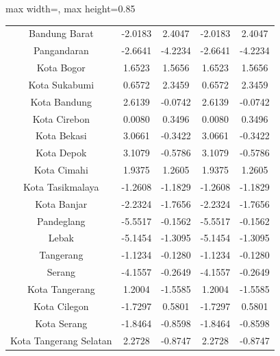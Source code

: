 \begin{table}[H]
\begin{adjustbox}{max width=\textwidth, max height=0.85\textheight}
\begin{tabular}{|c|c|c|c|c|}
Bandung Barat & -2.0183 & 2.4047 & -2.0183 & 2.4047 \\
Pangandaran & -2.6641 & -4.2234 & -2.6641 & -4.2234 \\
Kota Bogor & 1.6523 & 1.5656 & 1.6523 & 1.5656 \\
Kota Sukabumi & 0.6572 & 2.3459 & 0.6572 & 2.3459 \\
Kota Bandung & 2.6139 & -0.0742 & 2.6139 & -0.0742 \\
Kota Cirebon & 0.0080 & 0.3496 & 0.0080 & 0.3496 \\
Kota Bekasi & 3.0661 & -0.3422 & 3.0661 & -0.3422 \\
Kota Depok & 3.1079 & -0.5786 & 3.1079 & -0.5786 \\
Kota Cimahi & 1.9375 & 1.2605 & 1.9375 & 1.2605 \\
Kota Tasikmalaya & -1.2608 & -1.1829 & -1.2608 & -1.1829 \\
Kota Banjar & -2.2324 & -1.7656 & -2.2324 & -1.7656 \\
Pandeglang & -5.5517 & -0.1562 & -5.5517 & -0.1562 \\
Lebak & -5.1454 & -1.3095 & -5.1454 & -1.3095 \\
Tangerang & -1.1234 & -0.1280 & -1.1234 & -0.1280 \\
Serang & -4.1557 & -0.2649 & -4.1557 & -0.2649 \\
Kota Tangerang & 1.2004 & -1.5585 & 1.2004 & -1.5585 \\
Kota Cilegon & -1.7297 & 0.5801 & -1.7297 & 0.5801 \\
Kota Serang & -1.8464 & -0.8598 & -1.8464 & -0.8598 \\
Kota Tangerang Selatan & 2.2728 & -0.8747 & 2.2728 & -0.8747 \\
\hline
\end{tabular}
\end{adjustbox}
\end{table}